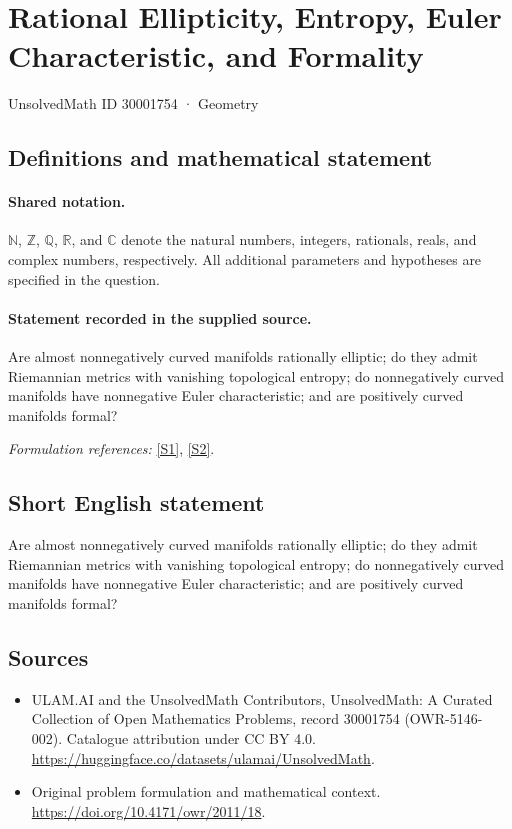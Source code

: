 \documentclass[11pt]{article}
\newcommand{\sref}[2]{\hyperlink{source:#1:#2}{[S#2]}}
\begin{document}
\setcounter{section}{30001753}
\section{Rational Ellipticity, Entropy, Euler Characteristic, and Formality}\label{30001754}
{\small UnsolvedMath ID 30001754 · Geometry}
\subsection{Definitions and mathematical statement}

\paragraph{Shared notation.}$\mathbb N$, $\mathbb Z$, $\mathbb Q$, $\mathbb R$, and $\mathbb C$ denote the natural numbers, integers, rationals, reals, and complex numbers, respectively. All additional parameters and hypotheses are specified in the question.


\paragraph{Statement recorded in the supplied source.}
Are almost nonnegatively curved manifolds rationally elliptic; do they admit Riemannian metrics with vanishing topological entropy; do nonnegatively curved manifolds have nonnegative Euler characteristic; and are positively curved manifolds formal?
\par\smallskip\textit{Formulation references:} \sref{30001754}{1}, \sref{30001754}{2}.
\subsection{Short English statement}
Are almost nonnegatively curved manifolds rationally elliptic; do they admit Riemannian metrics with vanishing topological entropy; do nonnegatively curved manifolds have nonnegative Euler characteristic; and are positively curved manifolds formal?
\subsection{Sources}
\begin{itemize}
\item[\hypertarget{source:30001754:1}{S1}] ULAM.AI and the UnsolvedMath Contributors, UnsolvedMath: A Curated Collection of Open Mathematics Problems, record 30001754 (OWR-5146-002). Catalogue attribution under CC BY 4.0.
\url{https://huggingface.co/datasets/ulamai/UnsolvedMath}.
\item[\hypertarget{source:30001754:2}{S2}] Original problem formulation and mathematical context.
\url{https://doi.org/10.4171/owr/2011/18}.
\end{itemize}
\label{end:30001754}
\end{document}
